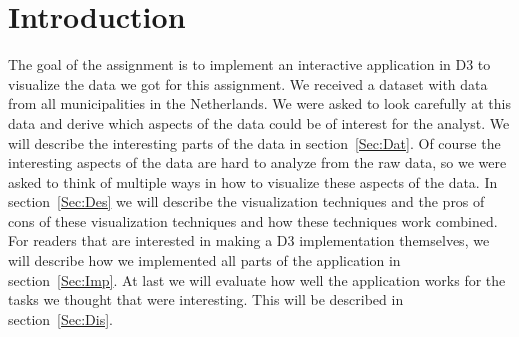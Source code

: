 \section{Introduction}
The goal of the assignment is to implement an interactive application in D3 to visualize the data we got for this assignment. We received a dataset with data from all municipalities in the Netherlands.  We were asked to look carefully at this data and derive which aspects of the data could be of interest for the analyst. We will describe the interesting parts of the data in section~\ref{Sec:Dat}. Of course the interesting aspects of the data are hard to analyze from the raw data, so we were asked to think of multiple ways in how to visualize these aspects of the data. In section~\ref{Sec:Des} we will describe the visualization techniques and the pros of cons of these visualization techniques and how these techniques work combined. For readers that are interested in making a D3 implementation themselves, we will describe how we implemented all parts of the application in section~\ref{Sec:Imp}. At last we will evaluate how well the application works for the tasks we thought that were interesting. This will be described in section~\ref{Sec:Dis}.